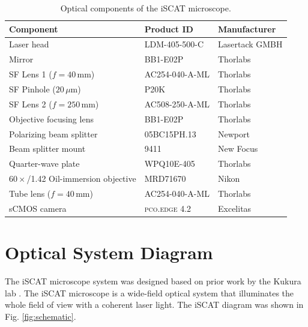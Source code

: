 \begin{table}[h!]
    \centering
    \begin{tabularx}{\textwidth}{@{}Xll@{}}
        \toprule
        \textbf{Component} & \textbf{Product ID} & \textbf{Manufacturer} \\
        \midrule
        Laser head                          & LDM-405-500-C             & Lasertack GMBH      \\
        Mirror                              & BB1-E02P         & Thorlabs  \\
        \addlinespace[8pt]
        SF Lens 1 ($f = 40$\,mm)               & AC254-040-A-ML   & Thorlabs  \\
        SF Pinhole ($20\,\mu$m)                & P20K             & Thorlabs  \\
        SF Lens 2 ($f = 250$\,mm)              & AC508-250-A-ML   & Thorlabs  \\
        \addlinespace[8pt]
        Objective focusing lens             & BB1-E02P         & Thorlabs  \\
        Polarizing beam splitter            & 05BC15PH.13      & Newport   \\
        Beam splitter mount                 & 9411             & New Focus \\
        Quarter-wave plate                  & WPQ10E-405       & Thorlabs  \\
        $60\times$/1.42 Oil-immersion objective  & MRD71670             & Nikon     \\
        \addlinespace[8pt]
        Tube lens ($f = 40$\,mm)            & AC254-040-A-ML   & Thorlabs  \\
        sCMOS camera                        & \textsc{pco.edge 4.2}     & Excelitas \\
        \bottomrule
    \end{tabularx}
    \caption{Optical components of the iSCAT microscope.}
    \label{tab:components}
\end{table}

\newpage
\section{Optical System Diagram}

The iSCAT microscope system was designed based on prior work by the Kukura lab \cite{OrtegaArroyo2016, ortega-arroyoInterferometricScatteringMicroscopy2012}. The iSCAT microscope is a wide-field optical system that illuminates the whole field of view with a coherent laser light. The iSCAT diagram was shown in Fig. \ref{fig:schematic}. 

